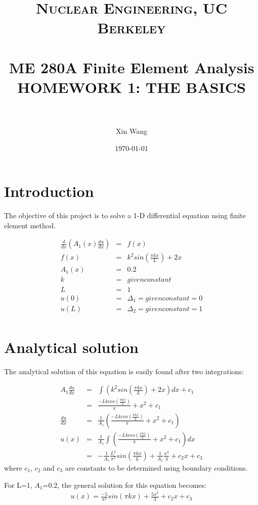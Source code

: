 \documentclass[paper=a4, fontsize=11pt]{article} %
\title{	
\normalfont \normalsize 
\textsc{Nuclear Engineering, UC Berkeley} \\ [25pt] %
\horrule{0.5pt} \\[0.4cm] %
\huge ME 280A Finite Element Analysis \\HOMEWORK 1: THE BASICS  \\  %
\horrule{2pt} \\[0.5cm] %
}
\author{Xin Wang} %
\date{\normalsize\today} %
\begin{document}
\maketitle %

\newpage
\section{Introduction}
The objective of this project is to solve a 1-D differential equation using finite element method. 

\begin{eqnarray}
\frac{d}{dx}(A_1(x) \frac{du}{dx}) &=& f(x)\nonumber\\
f(x)&=&k^2 sin(\frac{\pi kx}{L}) + 2x \nonumber\\
A_1(x)& = &0.2 \nonumber\\
k &= &given constant \nonumber\\
L&=&1 \nonumber\\
u(0)& =& \Delta_1 = given constant =0 \nonumber\\
u(L) &= &\Delta_2 =given constant =1 \nonumber\\
\end{eqnarray}

\section{Analytical solution}
The analytical solution of this equation is easily found after two integrations:

\begin{eqnarray}
A_1 \frac{du}{dx}&=&\int( k^2 sin(\frac{\pi kx}{L}) + 2x ) dx + c_1\nonumber\\
&=& \frac{-Lk cos(\frac{\pi kx}{L})}{\pi} + x^2 +c_1 \nonumber\\
\frac{du}{dx}&=&\frac{1}{A_1}(\frac{-Lk cos(\frac{\pi kx}{L})}{\pi} + x^2 +c_1) \nonumber\\
u(x)&=&\frac{1}{A_1}\int(\frac{-Lk cos(\frac{\pi kx}{L})}{\pi} + x^2 +c_1)dx\nonumber\\
&=&-\frac{1}{A_1}\frac{L^2}{\pi^2} sin(\frac{\pi kx}{L}) + \frac{1}{A_1}\frac{x^3}{3} + c_2x+ c_3
\end{eqnarray}
where $c_1$, $c_2$ and $c_3$ are constants to be determined using boundary conditions. 

For L=1, $A_1$=0.2, the general solution for this equation becomes:
\begin{eqnarray}
u(x)=\frac{-5}{\pi ^2}sin(\pi kx) + \frac{5x^3}{3} + c_2x+ c_3
\end{eqnarray}
\end{document}
